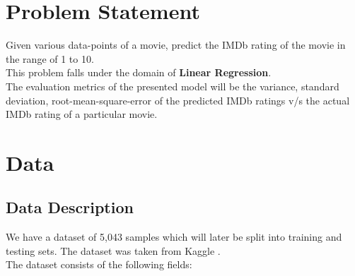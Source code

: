 \documentclass[conference]{IEEEtran}
\begin{document}
\section{Problem Statement}
Given various data-points of a movie, predict the IMDb rating of the movie in the range of 1 to 10.\\
This problem falls under the domain of \textbf{Linear Regression}.\\
The evaluation metrics of the presented model will be the variance, standard deviation, root-mean-square-error of the predicted IMDb ratings v/s the actual IMDb rating of a particular movie.\\
\newpage
\section{Data}
\subsection{Data Description}
We have a dataset of 5,043 samples which will later be split into training and testing sets. The dataset was taken from Kaggle \cite{data}.\\
The dataset consists of the following fields:
\end{document}
